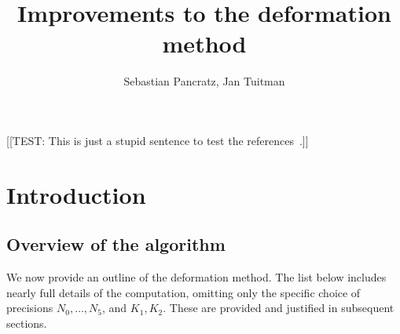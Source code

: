 \documentclass[a4paper,11pt]{article}
\author{Sebastian Pancratz, Jan Tuitman}
\title{Improvements to the deformation method}
\numberwithin{equation}{section}
\theoremstyle{definition}
\begin{document}
\maketitle

[[TEST:  This is just a stupid sentence to test the references~\citep{Gerkmann2007}.]]

\section{Introduction}

\subsection{Overview of the algorithm}

We now provide an outline of the deformation method.  The list below 
includes nearly full details of the computation, omitting only the 
specific choice of precisions $N_0, \dotsc, N_5$, and $K_1, K_2$.  
These are provided and justified in subsequent sections.
\end{document}
